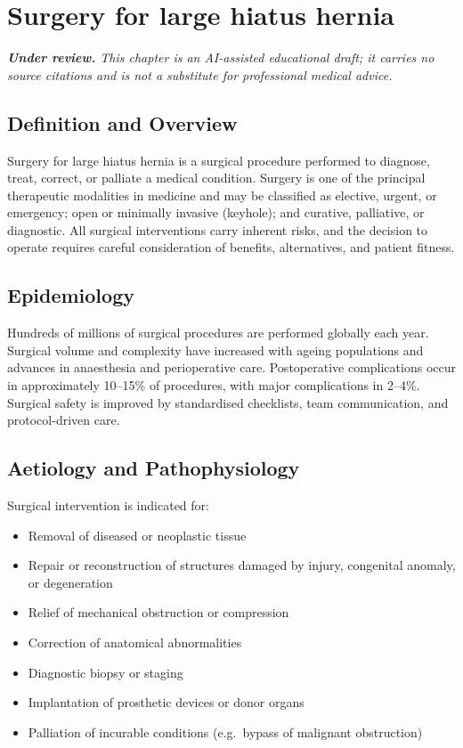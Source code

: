 \chapter{Surgery for large hiatus hernia}

\medskip
\noindent\textit{\textbf{Under review.} This chapter is an AI-assisted educational draft; it carries no source citations and is not a substitute for professional medical advice.}

\section*{Definition and Overview}
Surgery for large hiatus hernia is a surgical procedure performed to diagnose, treat, correct, or palliate a medical condition. Surgery is one of the principal therapeutic modalities in medicine and may be classified as elective, urgent, or emergency; open or minimally invasive (keyhole); and curative, palliative, or diagnostic. All surgical interventions carry inherent risks, and the decision to operate requires careful consideration of benefits, alternatives, and patient fitness.

\section*{Epidemiology}
Hundreds of millions of surgical procedures are performed globally each year. Surgical volume and complexity have increased with ageing populations and advances in anaesthesia and perioperative care. Postoperative complications occur in approximately 10--15\% of procedures, with major complications in 2--4\%. Surgical safety is improved by standardised checklists, team communication, and protocol-driven care.

\section*{Aetiology and Pathophysiology}
Surgical intervention is indicated for:

\begin{itemize}
    \item Removal of diseased or neoplastic tissue
    \item Repair or reconstruction of structures damaged by injury, congenital anomaly, or degeneration
    \item Relief of mechanical obstruction or compression
    \item Correction of anatomical abnormalities
    \item Diagnostic biopsy or staging
    \item Implantation of prosthetic devices or donor organs
    \item Palliation of incurable conditions (e.g.\ bypass of malignant obstruction)
\end{itemize}

